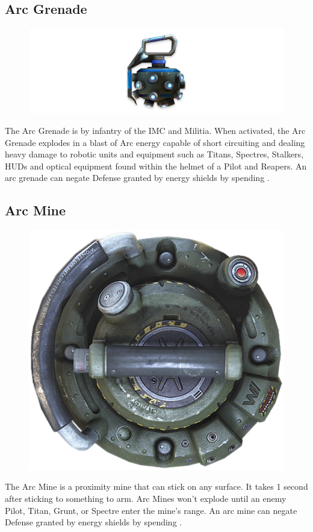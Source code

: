 \documentclass[9pt, openany]{extbook}
\begin{document}
\subsection{Arc Grenade}
\begin{figure}
\vspace*{-2em}
\includegraphics[width=\linewidth]{ArcGrenade}
\end{figure}

The Arc Grenade is by infantry of the IMC and Militia. When activated, the Arc Grenade explodes in a blast of Arc energy capable of short circuiting and dealing heavy damage to robotic units and equipment such as Titans, Spectres, Stalkers, HUDs and optical equipment found within the helmet of a Pilot and Reapers. An arc grenade can negate Defense granted by energy shields by spending \Advantage\Advantage.

\subsection{Arc Mine}
\begin{figure}
\vspace*{-2em}\centering
\includegraphics[width=0.5\linewidth]{ArcMine}
\end{figure}

The Arc Mine is a proximity mine that can stick on any surface. It takes 1 second after sticking to something to arm. Arc Mines won't explode until an enemy Pilot, Titan, Grunt, or Spectre enter the mine's range. An arc mine can negate Defense granted by energy shields by spending \Advantage\Advantage.
\end{document}

